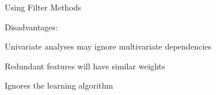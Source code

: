 \documentclass[11pt,compress,t,notes=noshow, xcolor=table]{beamer}
\begin{document}
\begin{vbframe}{Using Filter Methods}
  \begin{blocki}{Disadvantages:}
  \setlength{\itemsep}{1.2em}
    \item Univariate analyses may ignore multivariate dependencies
    \item Redundant features will have similar weights
    \item Ignores the learning algorithm
  \end{blocki}
  \end{vbframe}















  \endlecture
\end{document}
